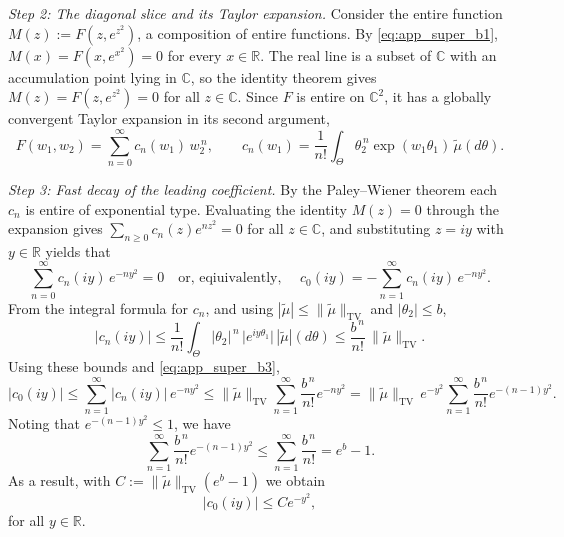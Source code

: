 \documentclass[11pt,twoside]{article} %
\begin{document}
\emph{Step 2: The diagonal slice and its Taylor expansion.}
Consider the entire function $M(z):=F(z,e^{z^2})$, a composition of entire functions. By
\eqref{eq:app_super_b1}, $M(x)=F(x,e^{x^2})=0$ for every $x\in\mathbb R$.
The real line is a subset of $\mathbb C$ with an accumulation point lying in $\mathbb C$,
so the identity theorem gives $M(z)=F(z,e^{z^2})=0$ for all $z\in\mathbb C$. Since $F$ is entire on
$\mathbb C^2$, it has a globally convergent Taylor expansion in its second argument,
\begin{equation*}
    F(w_1,w_2)=\sum_{n=0}^\infty c_n(w_1)\,w_2^{\,n},
    \qquad
    c_n(w_1)=\frac1{n!}\int_\Theta\theta_2^{\,n}\exp(w_1\theta_1)\,\tilde\mu(d\theta).
\end{equation*}

\emph{Step 3: Fast decay of the leading coefficient.}
By the Paley--Wiener theorem each $c_n$ is entire of exponential type. Evaluating the identity $M(z)=0$
through the expansion gives $\sum_{n\ge0}c_n(z)e^{nz^2}=0$ for all $z \in \mathbb{C}$, and substituting $z=iy$ with
$y\in\mathbb R$ yields that
\begin{equation}
    \sum_{n=0}^\infty c_n(iy)\,e^{-ny^2}=0
    \quad \text{or, eqiuivalently, } \quad
    c_0(iy)=-\sum_{n=1}^\infty c_n(iy)\,e^{-ny^2}.
    \label{eq:app_super_b3}
\end{equation}
From the integral formula for $c_n$, and using $|\tilde\mu|\le\|\tilde\mu\|_{\mathrm{TV}}$ and
$|\theta_2|\le b$,
\begin{equation*}
    |c_n(iy)|\le\frac1{n!}\int_\Theta|\theta_2|^{\,n}\,\big|e^{iy\theta_1}\big|\,|\tilde\mu|(d\theta)
    \le\frac{b^{\,n}}{n!}\,\|\tilde\mu\|_{\mathrm{TV}} .
\end{equation*}
Using these bounds and \eqref{eq:app_super_b3},
\begin{equation*}
    |c_0(iy)|\le\sum_{n=1}^\infty|c_n(iy)|\,e^{-ny^2}\le\|\tilde\mu\|_{\mathrm{TV}}\sum_{n=1}^\infty\frac{b^{\,n}}{n!}e^{-ny^2}=\|\tilde\mu\|_{\mathrm{TV}}\,e^{-y^2}\sum_{n=1}^\infty\frac{b^{\,n}}{n!}e^{-(n-1)y^2}.
\end{equation*}
Noting that $e^{-(n-1)y^2} \leq 1$, we have 
\begin{equation*}
    \sum_{n=1}^\infty\frac{b^{\,n}}{n!}e^{-(n-1)y^2} \leq \sum_{n=1}^{\infty} \frac{b^{\,n}}{n!} = e^b-1. 
\end{equation*}
As a result, with $C:=\|\tilde\mu\|_{\mathrm{TV}}(e^{b}-1)$ we obtain 
\[
|c_0(iy)|\le Ce^{-y^2},
\]
for all $y\in\mathbb R$.
\end{document}
